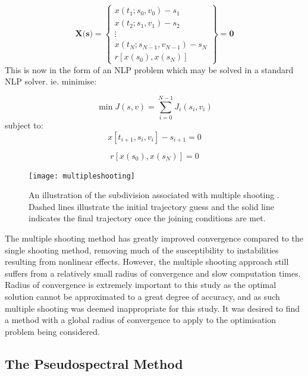 \begin{equation}
\textbf{X(s)} = \begin{Bmatrix}
x(t_1;s_0,v_0) - s_1 \\
x(t_2;s_1,v_1) - s_2  \\
\vdots    \\
x(t_N;s_{N-1},v_{N-1}) - s_N  \\
r[x(s_0),x(s_N)]
\end{Bmatrix} = \textbf{0}
\end{equation}
This is now in the form of an NLP problem which may be solved in a standard NLP solver. ie. minimise:

\begin{equation}
\min J(s,v) = \sum_{i=0}^{N-1}J_i(s_i,v_i)
\end{equation}
subject to:
\begin{equation}
x[t_{i+1},s_i,v_i] - s_{i+1} = 0
\end{equation}

\begin{equation}
r[x(s_0),x(s_N)] = 0
\end{equation}



\begin{figure}[ht]
	\centering
	\texttt{[image: multipleshooting]}
	\caption{An illustration of the subdivision associated with multiple shooting \cite{Michalik2009}. Dashed lines illustrate the initial trajectory guess and the solid line indicates the final trajectory once the joining conditions are met.}
	\label{fig:multipleshooting}
\end{figure}

The multiple shooting method has greatly improved convergence compared to the single shooting method, removing much of the susceptibility to instabilities resulting from nonlinear effects. However, the multiple shooting approach still suffers from a relatively small radius of convergence and slow computation times. Radius of convergence is extremely important to this study as the optimal solution cannot be approximated to a great degree of accuracy, and as such multiple shooting was deemed inappropriate for this study. It was desired to find a method with a global radius of convergence to apply to the optimisation problem being considered.

\subsection{The Pseudospectral Method}

